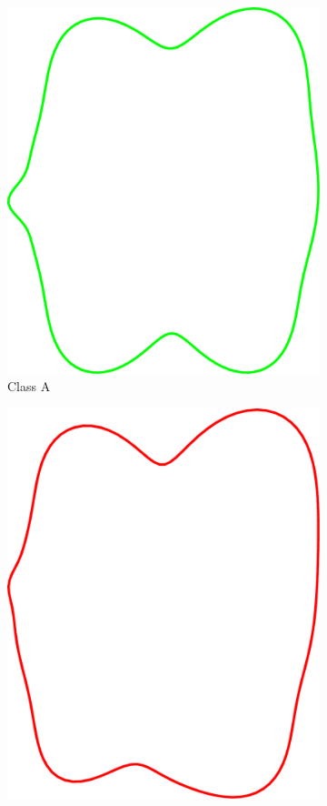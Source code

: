 \documentclass[pdftex,12pt,a4paper]{report}
\begin{document}
\begin{figure}
\begin{subfigure}[b]{0.24\textwidth}
		\includegraphics[width=.9\linewidth]{img/synthetic-generation/classes/1-2.pdf}
		\caption{Class A}
		\label{subfig:synthetic-classes:a-2}
	\end{subfigure}
	\begin{subfigure}[b]{0.24\textwidth}
		\centering
		\includegraphics[width=.9\linewidth]{img/synthetic-generation/classes/2-1.pdf}

\end{subfigure}
\end{figure}
\end{document}

